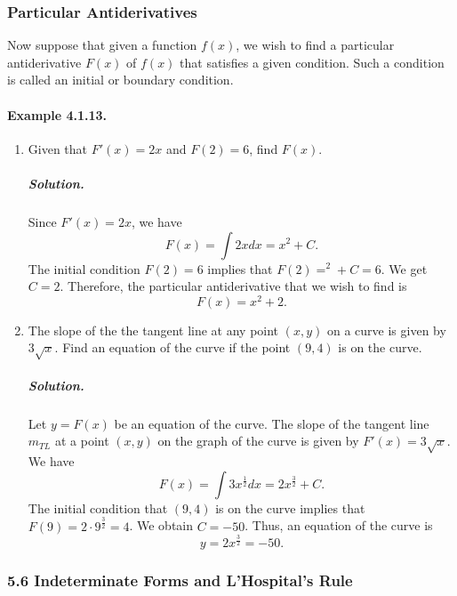 \documentclass[
  letterpaper,
  DIV=11,
  numbers=noendperiod]{scrartcl}
\let\oldparagraph\paragraph
\renewcommand{\paragraph}[1]{\oldparagraph{#1}\mbox{}}
\let\oldsubparagraph\subparagraph
\renewcommand{\subparagraph}[1]{\oldsubparagraph{#1}\mbox{}}
\theoremstyle{plain}
\theoremstyle{remark}
\begin{document}
\hypertarget{htm:ParticularAntiderivatives}{}
\hypertarget{particular-antiderivatives}{%
\subsubsection{Particular
Antiderivatives}\label{particular-antiderivatives}}

Now suppose that given a function \(f(x)\), we wish to find a particular
antiderivative \(F(x)\) of \(f(x)\) that satisfies a given condition.
Such a condition is called an initial or boundary condition.

\hypertarget{example-4.1.13.}{%
\paragraph{Example 4.1.13.}\label{example-4.1.13.}}

\hypertarget{exm:particular_derivatives}{}
\begin{enumerate}
\def\labelenumi{\arabic{enumi}.}
\item
  Given that \(F'(x)=2x\) and \(F(2)=6\), find \(F(x)\).

  \hypertarget{solution.}{%
  \subparagraph{\texorpdfstring{\emph{Solution}.}{Solution.}}\label{solution.}}

  Since \(F'(x)=2x\), we have \[
  F(x)=\int 2xdx=x^2+C.
  \]The initial condition \(F(2)=6\) implies that \(F(2)=^2+C=6\). We
  get \(C=2\). Therefore, the particular antiderivative that we wish to
  find is \[
  F(x)=x^2+2.
  \]
\item
  The slope of the the tangent line at any point \((x,y)\) on a curve is
  given by \(3\sqrt x\). Find an equation of the curve if the point
  \((9,4)\) is on the curve.

  \hypertarget{solution.-1}{%
  \subparagraph{\texorpdfstring{\emph{Solution}.}{Solution.}}\label{solution.-1}}

  Let \(y=F(x)\) be an equation of the curve. The slope of the tangent
  line \(m_{TL}\) at a point \((x,y)\) on the graph of the curve is
  given by \(F'(x)=3\sqrt x\). We have \[
  F(x)=\int 3x^\frac{1}{2}dx=2x^\frac{3}{2}+C.
  \]The initial condition that \((9,4)\) is on the curve implies that
  \(F(9)=2\cdot 9^\frac{3}{2}=4\). We obtain \(C=-50\). Thus, an
  equation of the curve is \[
  y=2x^\frac{3}{2}=-50.
  \]
\end{enumerate}

\hypertarget{indeterminate-forms-and-lhospitals-rule}{%
\subsubsection{5.6 Indeterminate Forms and L'Hospital's
Rule}\label{indeterminate-forms-and-lhospitals-rule}}
\end{document}
